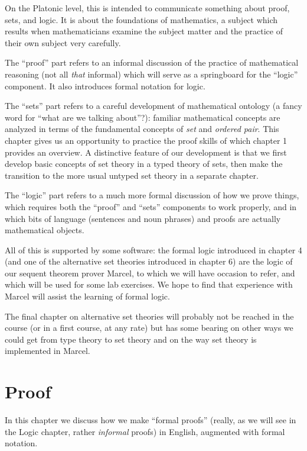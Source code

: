 \documentclass[12pt]{book}
\begin{document}
On the Platonic level, this is intended to communicate something about
proof, sets, and logic.  It is about the foundations of mathematics, a
subject which results when mathematicians examine the subject matter
and the practice of their own subject very carefully.

The ``proof'' part refers to an informal discussion of the practice of mathematical reasoning (not all {\em that\/} informal) which will serve as a
springboard for the ``logic'' component.  It also introduces formal
notation for logic.

The ``sets'' part refers to a careful development of mathematical
ontology (a fancy word for ``what are we talking about''?): familiar
mathematical concepts are analyzed in terms of the fundamental concepts 
of {\em set\/} and {\em ordered pair\/}.  This chapter gives us an opportunity to practice
the proof skills of which chapter 1 provides an overview.  A
distinctive feature of our development is that we first develop basic
concepts of set theory in a typed theory of sets, then make the
transition to the more usual untyped set theory in a separate chapter.

The ``logic'' part refers to a much more formal discussion of how we
prove things, which requires both the ``proof'' and ``sets''
components to work properly, and in which bits of language (sentences
and noun phrases) and proofs are actually mathematical objects.

All of this is supported by some software: the formal logic introduced
in chapter 4  (and one of the alternative set theories introduced in
chapter 6) are the logic of our sequent theorem prover Marcel, to
which we will have occasion to refer, and which will be used for some
lab exercises.  We hope to find that experience with Marcel will
assist the learning of formal logic.

The final chapter on alternative set theories will probably not be
reached in the course (or in a first course, at any rate) but has some bearing on other ways we could get
from type theory to set theory and on the way set theory is
implemented in Marcel.

\newpage

\chapter{Proof}

In this chapter we discuss how we make ``formal proofs'' (really, as
we will see in the Logic chapter, rather {\em informal\/} proofs) in
English, augmented with formal notation.
\end{document}

